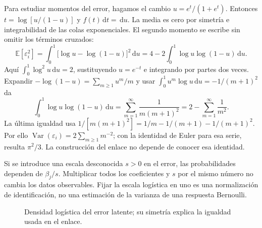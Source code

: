 \documentclass[11pt,a4paper]{article}
\newcommand{\E}{\mathbb E}
\newcommand{\dd}{\,\mathrm d}
\DeclareMathOperator{\Var}{Var}
\begin{document}
Para estudiar momentos del error, hagamos el cambio
\(u=e^t/(1+e^t)\). Entonces \(t=\log[u/(1-u)]\) y \(f(t)\dd t=\dd u\).
La media es cero por simetría e integrabilidad de las colas exponenciales.
El segundo momento se escribe sin omitir los términos cruzados:
\[
\E[\varepsilon_i^2]=
\int_0^1\bigl[\log u-\log(1-u)\bigr]^2\dd u
=4-2\int_0^1\log u\log(1-u)\dd u.
\]
Aquí \(\int_0^1\log^2u\dd u=2\), sustituyendo \(u=e^{-t}\)
e integrando por partes dos veces.
Expandir \(-\log(1-u)=\sum_{m\ge1}u^m/m\) y usar
\(\int_0^1u^m\log u\dd u=-1/(m+1)^2\) da
\[
\int_0^1\log u\log(1-u)\dd u
=\sum_{m=1}^{\infty}\frac1{m(m+1)^2}
=2-\sum_{m=1}^{\infty}\frac1{m^2}.
\]
La última igualdad usa
\(1/[m(m+1)^2]=1/m-1/(m+1)-1/(m+1)^2\).
Por ello \(\Var(\varepsilon_i)=2\sum_{m\ge1}m^{-2}\);
con la identidad de Euler para esa serie, resulta \(\pi^2/3\).
La construcción del enlace no depende de conocer esa identidad.

Si se introduce una escala desconocida \(s>0\) en el error, las
probabilidades dependen de \(\beta_j/s\).
Multiplicar todos los coeficientes y \(s\) por el mismo número
no cambia los datos observables. Fijar la escala logística en uno
es una normalización de identificación, no una estimación de
la varianza de una respuesta Bernoulli.

\begin{figure}[H]\centering
{}
\caption{Densidad logística del error latente; su simetría explica la igualdad usada en el enlace.}
\end{figure}

\clearpage
\end{document}
